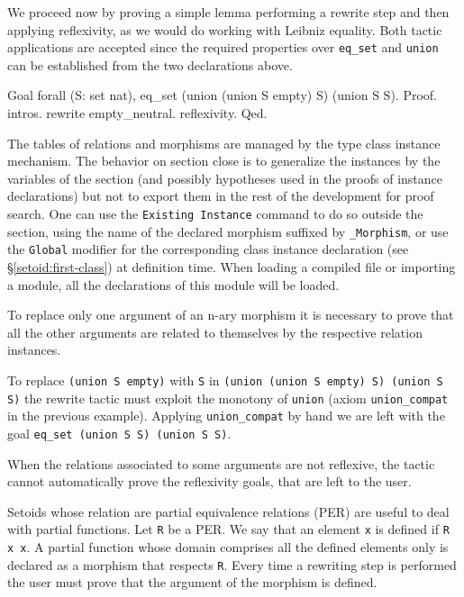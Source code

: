 We proceed now by proving a simple lemma performing a rewrite step
and then applying reflexivity, as we would do working with Leibniz
equality. Both tactic applications are accepted
since the required properties over \texttt{eq\_set} and
\texttt{union} can be established from the two declarations above.

\begin{coq_example*}
Goal forall (S: set nat),
 eq_set (union (union S empty) S) (union S S).
Proof. intros. rewrite empty_neutral. reflexivity. Qed.
\end{coq_example*}

The tables of relations and morphisms are managed by the type class
instance mechanism. The behavior on section close is to generalize
the instances by the variables of the section (and possibly hypotheses
used in the proofs of instance declarations) but not to export them in
the rest of the development for proof search. One can use the
\texttt{Existing Instance} command to do so outside the section,
using the name of the declared morphism suffixed by \texttt{\_Morphism}, 
or use the \texttt{Global} modifier for the corresponding class instance
declaration (see \S\ref{setoid:first-class}) at definition time.
When loading a compiled file or importing a module,
all the declarations of this module will be loaded.

To replace only one argument of an n-ary morphism it is necessary to prove
that all the other arguments are related to themselves by the respective
relation instances.

\begin{cscexample}
To replace \texttt{(union S empty)} with \texttt{S} in
\texttt{(union (union S empty) S) (union S S)} the rewrite tactic must
exploit the monotony of \texttt{union} (axiom \texttt{union\_compat} in
the previous example). Applying \texttt{union\_compat} by hand we are left
with the goal \texttt{eq\_set (union S S) (union S S)}.
\end{cscexample}

When the relations associated to some arguments are not reflexive, the tactic
cannot automatically prove the reflexivity goals, that are left to the user.

Setoids whose relation are partial equivalence relations (PER)
are useful to deal with partial functions. Let \texttt{R} be a PER. We say
that an element \texttt{x} is defined if \texttt{R x x}. A partial function
whose domain comprises all the defined elements only is declared as a
morphism that respects \texttt{R}. Every time a rewriting step is performed
the user must prove that the argument of the morphism is defined.


